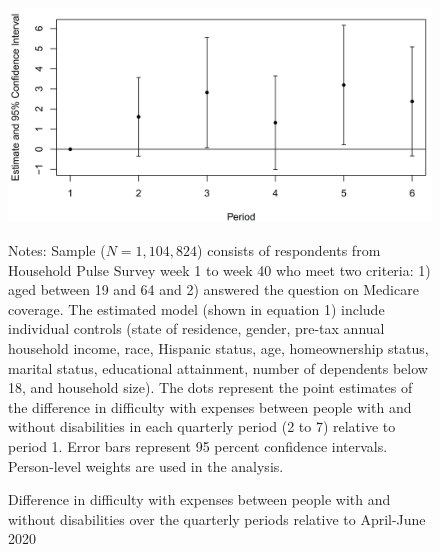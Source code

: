 \documentclass[12pt]{article}
\begin{document}
\begin{figure}[h!]\label{expens_dif_wc}
\caption{Difference in difficulty with expenses between people with and without disabilities over the quarterly periods relative to April-June 2020}
\centering
\includegraphics[scale=0.8]{Exhibits/expns_dif_event_study_with_controls.jpg}
\medskip 
\begin{minipage}{0.8\textwidth} 
{\footnotesize Notes: Sample ($N=1,104,824$) consists of respondents from Household Pulse Survey week 1 to week 40 who meet two criteria: 1) aged between 19 and 64 and 2) answered the question on Medicare coverage. The estimated model (shown in equation 1) include individual controls (state of residence, gender, pre-tax annual household income, race, Hispanic status, age, homeownership status,
marital status, educational attainment, number of dependents below 18, and household size). The dots represent the point estimates of the difference in difficulty with expenses between people with and without disabilities in each quarterly period (2 to 7) relative to period 1. Error bars represent 95 percent confidence intervals. Person-level weights are used in the analysis. \par}
\end{minipage}
\end{figure}
\end{document}
